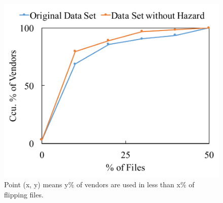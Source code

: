 \begin{figure}[!htb]
\endminipage\hfill
{}
  \includegraphics[width=\linewidth]{figure/flip_vendor}
  {Point (x, y) means y\% of vendors are used in less than x\% of flipping files.}
\endminipage\hfill
\end{figure}